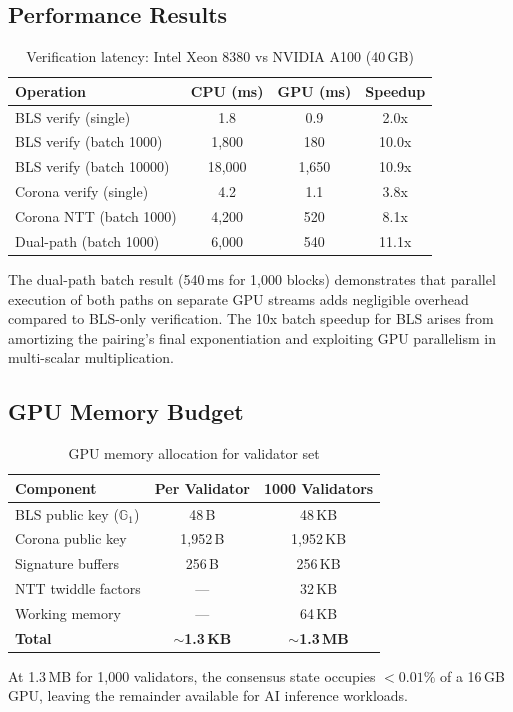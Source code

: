 \subsection{Performance Results}

\begin{table}[h]
\centering
\begin{tabular}{lccc}
\toprule
\textbf{Operation} & \textbf{CPU (ms)} & \textbf{GPU (ms)} & \textbf{Speedup} \\
\midrule
BLS verify (single) & 1.8 & 0.9 & 2.0x \\
BLS verify (batch 1000) & 1,800 & 180 & 10.0x \\
BLS verify (batch 10000) & 18,000 & 1,650 & 10.9x \\
Corona verify (single) & 4.2 & 1.1 & 3.8x \\
Corona NTT (batch 1000) & 4,200 & 520 & 8.1x \\
Dual-path (batch 1000) & 6,000 & 540 & 11.1x \\
\bottomrule
\end{tabular}
\caption{Verification latency: Intel Xeon 8380 vs NVIDIA A100 (40\,GB)}
\label{tab:gpu-perf}
\end{table}

The dual-path batch result (540\,ms for 1,000 blocks) demonstrates that parallel execution of both paths on separate GPU streams adds negligible overhead compared to BLS-only verification. The 10x batch speedup for BLS arises from amortizing the pairing's final exponentiation and exploiting GPU parallelism in multi-scalar multiplication.

\subsection{GPU Memory Budget}

\begin{table}[h]
\centering
\begin{tabular}{lcc}
\toprule
\textbf{Component} & \textbf{Per Validator} & \textbf{1000 Validators} \\
\midrule
BLS public key ($\mathbb{G}_1$) & 48\,B & 48\,KB \\
Corona public key & 1,952\,B & 1,952\,KB \\
Signature buffers & 256\,B & 256\,KB \\
NTT twiddle factors & --- & 32\,KB \\
Working memory & --- & 64\,KB \\
\midrule
\textbf{Total} & \textbf{$\sim$1.3\,KB} & \textbf{$\sim$1.3\,MB} \\
\bottomrule
\end{tabular}
\caption{GPU memory allocation for validator set}
\label{tab:gpu-mem}
\end{table}

At 1.3\,MB for 1,000 validators, the consensus state occupies $< 0.01\%$ of a 16\,GB GPU, leaving the remainder available for AI inference workloads.

